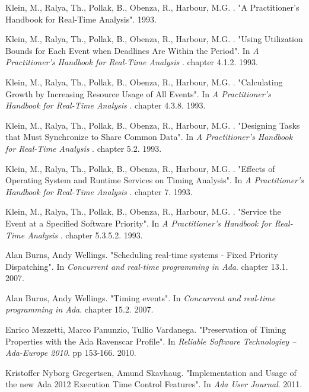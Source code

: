 \documentclass{article}
\begin{document}
\begin{thebibliography}{1}
Klein, M., Ralya, Th., Pollak, B., Obenza, R., Harbour, M.G. .
\newblock "A Practitioner's Handbook for Real-Time Analysis". 1993.

Klein, M., Ralya, Th., Pollak, B., Obenza, R., Harbour, M.G. .
\newblock "Using Utilization Bounds for Each Event when Deadlines Are Within the Period".
\newblock In {\em A Practitioner's Handbook for Real-Time Analysis
}. chapter 4.1.2. 1993.

Klein, M., Ralya, Th., Pollak, B., Obenza, R., Harbour, M.G. .
\newblock "Calculating Growth by Increasing Resource Usage of All Events".
\newblock In {\em A Practitioner's Handbook for Real-Time Analysis
}. chapter 4.3.8. 1993.

Klein, M., Ralya, Th., Pollak, B., Obenza, R., Harbour, M.G. .
\newblock "Designing Tasks that Must Synchronize to Share Common Data".
\newblock In {\em A Practitioner's Handbook for Real-Time Analysis
}. chapter 5.2. 1993.

Klein, M., Ralya, Th., Pollak, B., Obenza, R., Harbour, M.G. .
\newblock "Effects of Operating System and Runtime Services on Timing Analysis".
\newblock In {\em A Practitioner's Handbook for Real-Time Analysis
}. chapter 7. 1993.

Klein, M., Ralya, Th., Pollak, B., Obenza, R., Harbour, M.G. .
\newblock "Service the Event at a Specified Software Priority".
\newblock In {\em A Practitioner's Handbook for Real-Time Analysis
}. chapter 5.3.5.2. 1993.

Alan Burns, Andy Wellings.
\newblock "Scheduling real-time systems - Fixed Priority Dispatching".
\newblock In {\em Concurrent and real-time programming in Ada}. chapter 13.1. 2007.

Alan Burns, Andy Wellings.
\newblock "Timing events".
\newblock In {\em Concurrent and real-time programming in Ada}. chapter 15.2. 2007.

Enrico Mezzetti, Marco Panunzio, Tullio Vardanega.
\newblock "Preservation of Timing Properties with the Ada Ravenscar Profile".
\newblock In {\em Reliable Software Technologiey – Ada-Europe 2010}. pp 153-166. 2010.

Kristoffer Nyborg Gregertsen, Amund Skavhaug.
\newblock "Implementation and Usage of the new Ada 2012 Execution Time Control Features".
\newblock In {\em Ada User Journal}. 2011.


\end{thebibliography}
\end{document}

